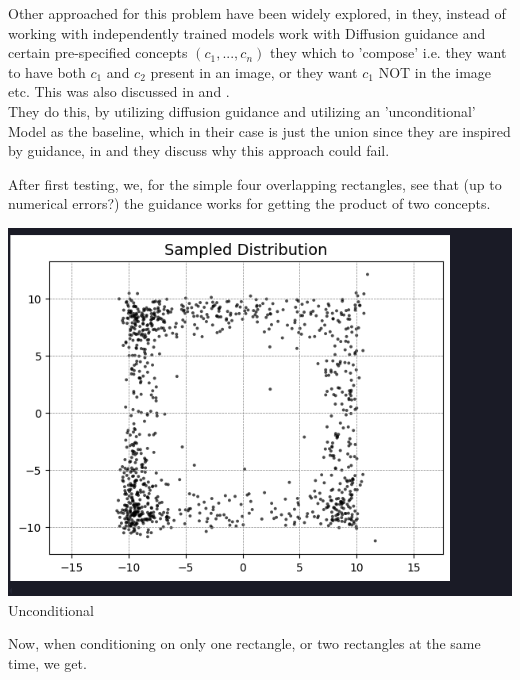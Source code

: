 \documentclass{article}
\begin{document}
Other approached for this problem have been widely explored, in \cite{liu2023compositionalvisualgenerationcomposable} they, instead of working with independently trained models work with Diffusion guidance and certain 
pre-specified concepts $(c_1,...,c_n)$ they which to 'compose' i.e. they want to have both $c_1$ and $c_2$ present in an image, or they want $c_1$ NOT in the image etc. This was also discussed in \cite{reduce} and \cite{bradley2025mechanismsprojectivecompositiondiffusion}. \\

They do this, by utilizing diffusion guidance and utilizing an 'unconditional' Model as the baseline, which in their case is just the union since they are inspired by guidance, in \cite{bradley2025mechanismsprojectivecompositiondiffusion} and \cite{reduce} they discuss why this approach could fail. 

After first testing, we, for the simple four overlapping rectangles, see that (up to numerical errors?) the guidance works for getting the product of two concepts. 
 
\begin{center}
  \centering
\begin{minipage}{0.7\textwidth}
  \includegraphics[width=\linewidth]{images_guidance1/unconditionalguidance.png}
  \centering\small Unconditional 
\end{minipage}

\end{center}

Now, when conditioning on only one rectangle, or two rectangles at the same time, we get. 
\end{document}
